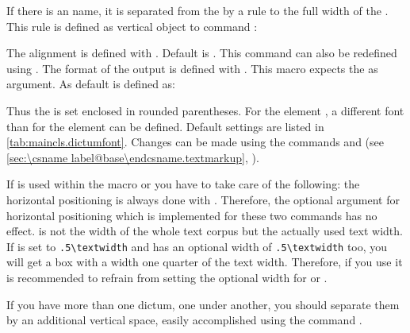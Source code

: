 If there is an  name, it is separated from the  by
a rule to the full width of the
. This%
 rule is defined
as vertical object to command :
\begin{lstcode}
  \newcommand*{\dictumrule}{\vskip-1ex\hrulefill\par}
\end{lstcode}

The alignment is defined with . Default is
. This command can also be redefined using
. The format of the output is defined with
. This macro expects the  as
argument. As default  is defined as:
\begin{lstcode}
  \newcommand*{\dictumauthorformat}[1]{(#1)}
\end{lstcode}
Thus the  is set enclosed in rounded parentheses. For
the element , a different font than for the
element  can be defined. Default settings are
listed in \autoref{tab:maincls.dictumfont}. Changes can be made using
the commands  and  (see
\autoref{sec:\csname label@base\endcsname.textmarkup},
).%
%
\ifCommonmaincls

If  is used within the macro 
or  you have to take care of the following: the
horizontal positioning is always done with .
Therefore, the optional argument for horizontal positioning which is
implemented for these two commands has no effect.  is
not the width of the whole text corpus but the actually used text
width.  If  is set to \verb;.5\textwidth; and
 has an optional width of
\verb;.5\textwidth; too, you will get a box with a width one quarter
of the text width.  Therefore, if you use  it is
recommended to refrain from setting the optional width for
 or .

If you have more than one dictum, one under another, you should
separate them by an additional vertical space, easily accomplished using the
command .

